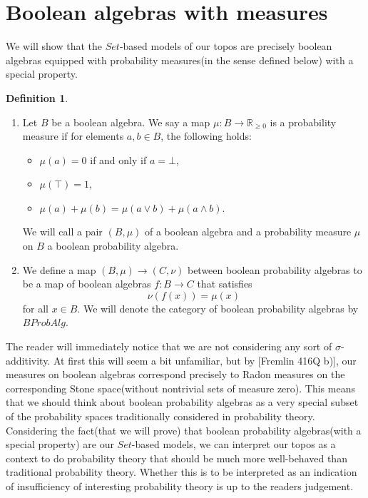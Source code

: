 \documentclass[a4paper,draft]{amsproc}
\theoremstyle{plain}
\theoremstyle{definition}
\newtheorem{definition}{Definition}[section]
\theoremstyle{remark}
\numberwithin{equation}{section}
\begin{document}
\section{Boolean algebras with measures}

We will show that the $Set$-based models of our topos are precisely boolean algebras equipped with probability measures(in the sense defined below) with a special property.

\begin{definition}
\begin{enumerate}
\item Let $B$ be a boolean algebra. We say a map $\mu: B \to \mathbb{R}_{\geq 0}$ is a probability measure if for elements $a,b \in B$, the following holds:
\begin{itemize}
\item $\mu(a) = 0$ if and only if $a = \bot $,
\item $\mu(\top) = 1$,
\item $\mu(a) + \mu(b) = \mu(a \vee b) + \mu(a \wedge b)$.
\end{itemize}
We will call a pair $(B, \mu)$ of a boolean algebra and a probability measure $\mu$ on $B$ a boolean probability algebra.
\item We define a map $(B, \mu) \to (C, \nu)$ between boolean probability algebras to be a map of boolean algebras $f: B \to C$ that satisfies
\[
\nu(f(x)) = \mu(x)
\]
for all $x \in B$. We will denote the category of boolean probability algebras by $BProbAlg$.
\end{enumerate}
\end{definition}

The reader will immediately notice that we are not considering any sort of $\sigma$-additivity. At first this will seem a bit unfamiliar, but by [Fremlin 416Q b)], our measures on boolean algebras correspond precisely to Radon measures on the corresponding Stone space(without nontrivial sets of measure zero). This means that we should think about boolean probability algebras as a very special subset of the probability spaces traditionally considered in probability theory. Considering the fact(that we will prove) that boolean probability algebras(with a special property) are our $Set$-based models, we can interpret our topos as a context to do probability theory that should be much more well-behaved than traditional probability theory. Whether this is to be interpreted as an indication of insufficiency of interesting probability theory is up to the readers judgement.
\end{document}
